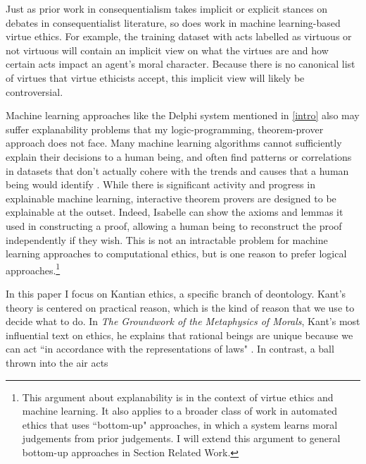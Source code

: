 \begin{isabellebody}
\begin{isamarkuptext}
Just as prior work in consequentialism takes implicit or explicit stances on debates in consequentialist
literature, so does work in machine learning-based virtue ethics. For example, the training 
dataset with acts labelled as virtuous or not virtuous will contain an implicit view on what the virtues
are and how certain acts impact an agent's moral character. Because there is no canonical list of virtues
that virtue ethicists accept, this implicit view will likely be controversial.

Machine learning approaches like the Delphi system \citep{delphi} mentioned in \ref{intro} also may suffer explanability 
problems that my logic-programming, theorem-prover
approach does not face. Many machine learning algorithms cannot sufficiently explain their 
decisions to a human being, and often find patterns or correlations in datasets that don't actually 
cohere with the trends and causes that a human being would identify \citep{puiutta}. While there is significant activity 
and progress in explainable machine learning, interactive theorem provers are designed to be explainable 
at the outset. Indeed, Isabelle can show the axioms and lemmas it used in constructing a proof, 
allowing a human being to reconstruct the proof independently if they wish. This is not an 
intractable problem for machine learning approaches to computational ethics, but is one reason to 
prefer logical approaches.\footnote{This argument about explanability is in the context of virtue ethics and 
machine learning. It also applies to a broader class of work in automated ethics 
that uses ``bottom-up" approaches, in which a system learns moral judgements from prior judgements. 
I will extend this argument to general bottom-up approaches in Section Related Work.}%
\end{isamarkuptext}\isamarkuptrue%
%
\isadelimdocument
%
\endisadelimdocument
%
\isatagdocument
%
\isamarkuptrue%
%
\endisatagdocument
{\isafolddocument}%
%
\isadelimdocument
%
\endisadelimdocument
%
\begin{isamarkuptext}%
In this paper I focus on Kantian ethics, a specific branch of deontology. Kant's theory is centered 
on practical reason, which is the kind of reason that we 
use to decide what to do. In \emph{The Groundwork of the Metaphysics of Morals}, Kant's most influential 
text on ethics, he explains that rational beings are unique because we can act ``in accordance with 
the representations of laws" \citep[4:412]{groundwork}. In contrast, a ball thrown into the air acts 

\end{isamarkuptext}
\end{isabellebody}
